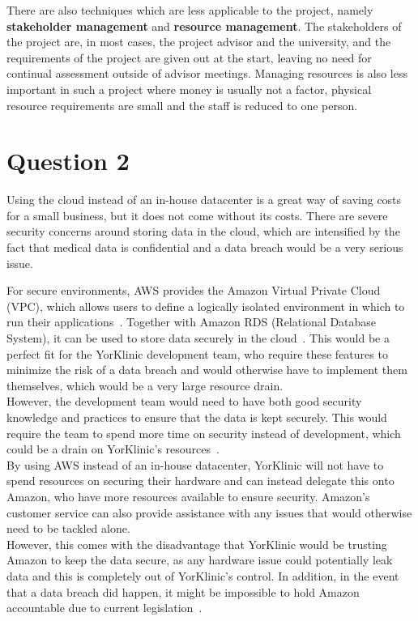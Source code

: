 \documentclass[12pt]{report}
\begin{document}
There are also techniques which are less applicable to the project, namely \textbf{stakeholder management} and \textbf{resource management}. The stakeholders of the project are, in most cases, the project advisor and the university, and the requirements of the project are given out at the start, leaving no need for continual assessment outside of advisor meetings. Managing resources is also less important in such a project where money is usually not a factor, physical resource requirements are small and the staff is reduced to one person.

\newpage
\section*{Question 2}
Using the cloud instead of an in-house datacenter is a great way of saving costs for a small business, but it does not come without its costs. There are severe security concerns around storing data in the cloud, which are intensified by the fact that medical data is confidential and a data breach would be a very serious issue.

For secure environments, AWS provides the Amazon Virtual Private Cloud (VPC), which allows users to define a logically isolated environment in which to run their applications~\cite{vpc}. Together with Amazon RDS (Relational Database System), it can be used to store data securely in the cloud~\cite{rds}. This would be a perfect fit for the YorKlinic development team, who require these features to minimize the risk of a data breach and would otherwise have to implement them themselves, which would be a very large resource drain.\\
    
However, the development team would need to have both good security knowledge and practices to ensure that the data is kept securely. This would require the team to spend more time on security instead of development, which could be a drain on YorKlinic's resources~\cite{altoncloud}.\\

By using AWS instead of an in-house datacenter, YorKlinic will not have to spend resources on securing their hardware and can instead delegate this onto Amazon, who have more resources available to ensure security. Amazon's customer service can also provide assistance with any issues that would otherwise need to be tackled alone.\\

However, this comes with the disadvantage that YorKlinic would be trusting Amazon to keep the data secure, as any hardware issue could potentially leak data and this is completely out of YorKlinic's control. In addition, in the event that a data breach did happen, it might be impossible to hold Amazon accountable due to current legislation~\cite{cloudrisk}.
\end{document}
